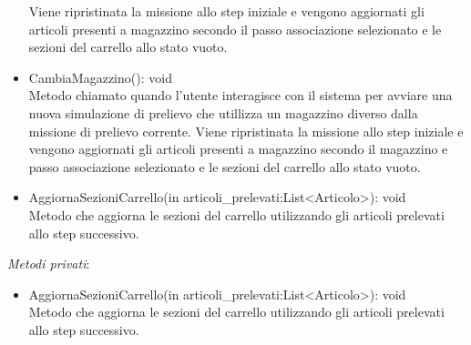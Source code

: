 \begin{itemize}
    Viene ripristinata la missione allo step iniziale e vengono aggiornati gli articoli presenti a magazzino secondo il passo associazione selezionato e le sezioni del carrello allo stato vuoto.
    \item CambiaMagazzino(): void\\
    Metodo chiamato quando l'utente interagisce con il sistema per avviare una nuova simulazione di prelievo che utillizza un magazzino diverso dalla missione di prelievo corrente.
    Viene ripristinata la missione allo step iniziale e vengono aggiornati gli articoli presenti a magazzino secondo il magazzino e passo associazione selezionato e le sezioni del carrello allo stato vuoto.
    \item AggiornaSezioniCarrello(in articoli\_prelevati:List<Articolo>): void\\
    Metodo che aggiorna le sezioni del carrello utilizzando gli articoli prelevati allo step successivo. 
\end{itemize} 
\textit{Metodi privati}:\\
\begin{itemize}
    \item AggiornaSezioniCarrello(in articoli\_prelevati:List<Articolo>): void\\
    Metodo che aggiorna le sezioni del carrello utilizzando gli articoli prelevati allo step successivo. 
\end{itemize}

